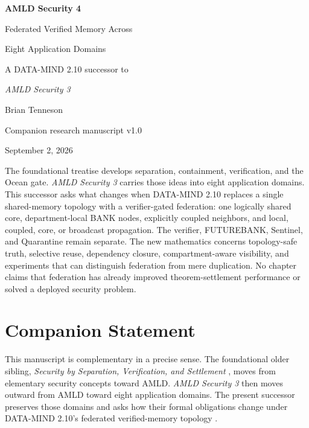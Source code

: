 \documentclass[11pt,oneside]{book}
\theoremstyle{definition}
\theoremstyle{remark}
\begin{document}
\frontmatter
\hypersetup{pageanchor=false}
\begin{titlepage}
\centering
\vspace*{1.05in}
{\Huge\bfseries AMLD Security 4\par}
\vspace{0.25in}
{\Large Federated Verified Memory Across\par}
\vspace{0.08in}
{\Large Eight Application Domains\par}
\vspace{0.45in}
{\large A DATA-MIND 2.10 successor to\par}
\vspace{0.08in}
{\large\itshape AMLD Security 3\par}
\vspace{0.65in}
{\large Brian Tenneson\par}
\vspace{0.22in}
{\large Companion research manuscript v1.0\par}
\vspace{0.08in}
{\large September 2, 2026\par}
\vfill
\begin{minipage}{0.84\textwidth}
\small
The foundational treatise develops separation, containment, verification, and the Ocean gate.
\emph{AMLD Security 3} carries those ideas into eight application domains. This successor asks what
changes when DATA-MIND 2.10 replaces a single shared-memory topology with a verifier-gated
federation: one logically shared core, department-local BANK nodes, explicitly coupled neighbors,
and local, coupled, core, or broadcast propagation. The verifier, FUTUREBANK, Sentinel, and
Quarantine remain separate. The new mathematics concerns topology-safe truth, selective reuse,
dependency closure, compartment-aware visibility, and experiments that can distinguish federation
from mere duplication. No chapter claims that federation has already improved theorem-settlement
performance or solved a deployed security problem.
\end{minipage}
\end{titlepage}
\hypersetup{pageanchor=true}

\chapter*{Companion Statement}
This manuscript is complementary in a precise sense. The foundational older sibling,
\emph{Security by Separation, Verification, and Settlement} \cite{TennesonSecurity}, moves from
elementary security concepts toward AMLD. \emph{AMLD Security 3} \cite{TennesonSecurity3} then moves outward from AMLD
toward eight application domains. The present successor preserves those domains and asks how their
formal obligations change under DATA-MIND 2.10's federated verified-memory topology
\cite{DataMind210ADR}.
\end{document}
